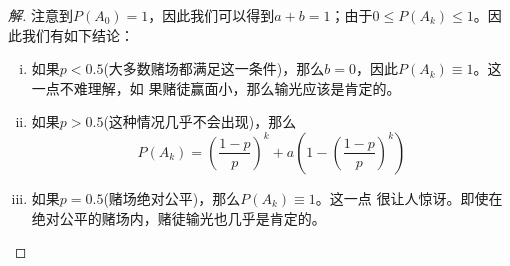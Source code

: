 \documentclass[12pt]{article}
\begin{document}
\begin{enumerate}
\begin{proof}[解]
	注意到$P(A_0)=1$，因此我们可以得到$a+b=1$；由于$0\le P(A_k)\le 1$。因此我们有如下结论：
	\begin{enumerate}[i)]
		\item 如果$p<0.5$(大多数赌场都满足这一条件)，那么$b=0$，因此$P(A_k)\equiv 1$。这一点不难理解，如 果赌徒赢面小，那么输光应该是肯定的。
		\item 如果$p>0.5$(这种情况几乎不会出现)，那么
		\begin{equation}
		P(A_k)=\left(\frac{1-p}{p}\right)^k+a\left(1-\left(\frac{1-p}{p}\right)^k\right)
		\end{equation}
		\item 如果$p=0.5$(赌场绝对公平)，那么$P(A_k)\equiv1$。这一点
		很让人惊讶。即使在绝对公平的赌场内，赌徒输光也几乎是肯定的。
	\end{enumerate}
\end{proof}


\end{enumerate}
\end{document}

